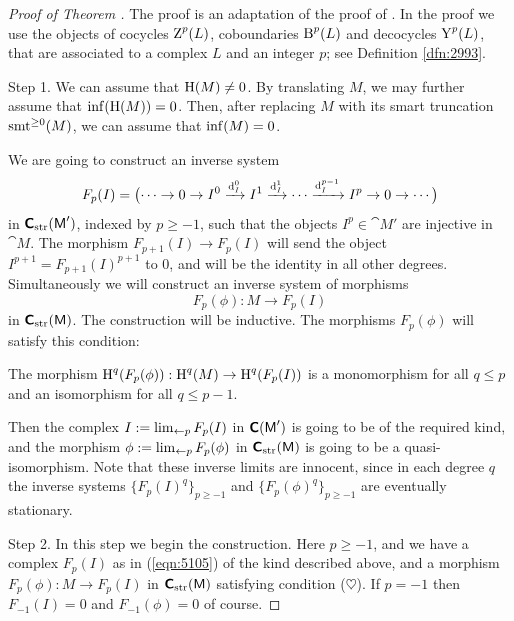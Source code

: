 \begin{proof}[Proof of Theorem \tup{\ref{thm:2880}}]
The proof is an adaptation of the proof of \cite[Proposition 1.7.11]{KaSc1}. 
In the proof we use the objects of cocycles $\operatorname{Z}^p(L)$, 
co\-boundaries $\operatorname{B}^p(L)$ and decocycles $\operatorname{Y}^p(L)$, that are 
associated to a complex $L$ and an integer $p$; see Definition \ref{dfn:2993}.

\medskip \noindent
Step 1. We can assume that $\operatorname{H}(M) \neq 0$. 
By translating $M$, we may further assume that $\operatorname{inf}(\operatorname{H}(M)) = 0$. 
Then, after replacing $M$ with its smart truncation $\operatorname{smt}^{\geq 0}(M)$, 
we can assume that $\operatorname{inf}(M) = 0$. 

We are going to construct an inverse system 
\begin{equation} \label{eqn:5105}
F_p(I) = \bigl( \cdots \to 0 \to I^0 \xrightarrow{\mathrm{d}_I^0} I^1 
\xrightarrow{\mathrm{d}_I^{1}} \cdots \xrightarrow{\mathrm{d}_I^{p - 1}} I^p \to 0 \to \cdots \bigr)
\end{equation}
in $\boldsymbol{\mathsf{C}}_{\mathrm{str}}(\operatorname{\mathsf{M}}')$, indexed by $p \geq -1$, such that
the objects $I^p \in \cat{M}'$ are injective in $\cat{M}$. 
The morphism $F_{p + 1}(I) \to F_{p}(I)$ will send the object 
$I^{p + 1} = F_{p + 1}(I)^{p + 1}$ to 
$0$, and will be the identity in all other degrees. 
Simultaneously we will 
construct an inverse system of morphisms 
\begin{equation} \label{eqn:5106}
F_p(\phi) : M \to F_p(I)
\end{equation}
in $\boldsymbol{\mathsf{C}}_{\mathrm{str}}(\operatorname{\mathsf{M}})$.
The construction will be inductive. 
The morphisms $F_p(\phi)$ will satisfy this condition:
\begin{itemize}
\rmitem{$\heartsuit$} The morphism 
$\operatorname{H}^q(F_p(\phi)) : \operatorname{H}^q(M) \to \operatorname{H}^q(F_p(I))$
is a monomorphism for all $q \leq p$ and an isomorphism for all
$q \leq p - 1$. 
\end{itemize}

Then the complex 
$I := \lim_{\leftarrow p} F_{p}(I)$ in $\boldsymbol{\mathsf{C}}(\operatorname{\mathsf{M}}')$
is going to be of the required kind, and the morphism 
$\phi := \lim_{\leftarrow p} F_{p}(\phi)$
in $\boldsymbol{\mathsf{C}}_{\mathrm{str}}(\operatorname{\mathsf{M}})$ is going to be a quasi-isomorphism.
Note that these inverse limits are innocent, since in each degree $q$ the 
inverse systems $\{ F_{p}(I)^q \}_{p \geq -1}$ and 
$\{ F_{p}(\phi)^q \}_{p \geq -1}$ are eventually stationary. 

\medskip \noindent
Step 2. In this step we begin the construction. 
Here $p \geq -1$, and we have a complex $F_p(I)$ as in (\ref{eqn:5105})
of the kind described above,
and a morphism $F_p(\phi) : M \to F_p(I)$ in 
$\boldsymbol{\mathsf{C}}_{\mathrm{str}}(\operatorname{\mathsf{M}})$ satisfying condition ($\heartsuit$). 
If  $p = -1$ then $F_{-1}(I) = 0$ and $F_{-1}(\phi) = 0$ of course.


\end{proof}
